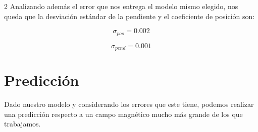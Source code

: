 \documentclass{article}
\begin{document}
\begin{multicols}{2}
    Analizando además el error que nos entrega el modelo mismo elegido, nos queda que la desviación estándar de la pendiente y el coeficiente de posición son:

    \begin{equation*}
        \sigma_{pos} =0.002
    \end{equation*}

    \begin{equation*}
        \sigma_{pend} =0.001
    \end{equation*}


\section*{Predicción}
Dado nuestro modelo y considerando los errores que este tiene, podemos realizar una predicción respecto a un campo magnético mucho más grande de los que trabajamos.




\end{multicols}
\end{document}
